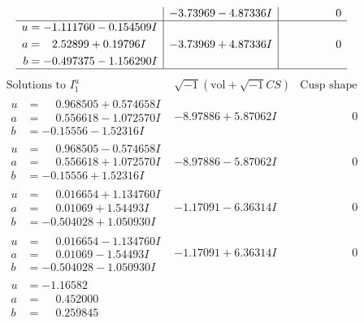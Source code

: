 \documentclass[1p]{elsarticle_modified}
\theoremstyle{definition}
\newcommand{\I}{\sqrt{-1}}
\begin{document}
$$\begin{array}{c|c|c}
 & -3.73969 - 4.87336 I & \phantom{-0.000000 } 0 \\ \hline\begin{aligned}
u &= -1.111760 - 0.154509 I \\
a &= \phantom{-}2.52899 + 0.19796 I \\
b &= -0.497375 - 1.156290 I\end{aligned}
 & -3.73969 + 4.87336 I & \phantom{-0.000000 } 0\\
 \hline 
 \end{array}$$\newpage$$\begin{array}{c|c|c}  
\text{Solutions to }I^u_{1}& \I (\text{vol} + \sqrt{-1}CS) & \text{Cusp shape}\\
 \hline 
\begin{aligned}
u &= \phantom{-}0.968505 + 0.574658 I \\
a &= \phantom{-}0.556618 - 1.072570 I \\
b &= -0.15556 - 1.52316 I\end{aligned}
 & -8.97886 + 5.87062 I & \phantom{-0.000000 } 0 \\ \hline\begin{aligned}
u &= \phantom{-}0.968505 - 0.574658 I \\
a &= \phantom{-}0.556618 + 1.072570 I \\
b &= -0.15556 + 1.52316 I\end{aligned}
 & -8.97886 - 5.87062 I & \phantom{-0.000000 } 0 \\ \hline\begin{aligned}
u &= \phantom{-}0.016654 + 1.134760 I \\
a &= \phantom{-}0.01069 + 1.54493 I \\
b &= -0.504028 + 1.050930 I\end{aligned}
 & -1.17091 - 6.36314 I & \phantom{-0.000000 } 0 \\ \hline\begin{aligned}
u &= \phantom{-}0.016654 - 1.134760 I \\
a &= \phantom{-}0.01069 - 1.54493 I \\
b &= -0.504028 - 1.050930 I\end{aligned}
 & -1.17091 + 6.36314 I & \phantom{-0.000000 } 0 \\ \hline\begin{aligned}
u &= -1.16582\phantom{ +0.000000I} \\
a &= \phantom{-}0.452000\phantom{ +0.000000I} \\
b &= \phantom{-}0.259845\phantom{ +0.000000I}\end{aligned}

\end{array}$$
\end{document}
